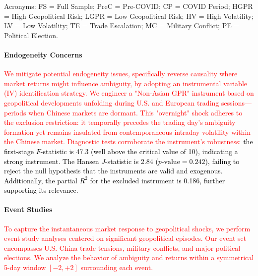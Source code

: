 \documentclass[preprint,12pt,authoryear]{elsarticle}
\begin{document}
\begin{table}[htbp]
\begin{threeparttable}
\begin{tablenotes}[flushleft]
\item[] Acronyms: FS = Full Sample; PreC = Pre-COVID; CP = COVID Period; HGPR = High Geopolitical Risk; LGPR = Low Geopolitical Risk; HV = High Volatility; LV = Low Volatility; TE = Trade Escalation; MC = Military Conflict; PE = Political Election.
\end{tablenotes}
\end{threeparttable}
\end{table}

\paragraph{Endogeneity Concerns} \textcolor{red}{We mitigate potential endogeneity issues, specifically reverse causality where market returns might influence ambiguity, by adopting an instrumental variable (IV) identification strategy. We engineer a "Non-Asian GPR" instrument based on geopolitical developments unfolding during U.S. and European trading sessions—periods when Chinese markets are dormant. This "overnight" shock adheres to the exclusion restriction: it temporally precedes the trading day's ambiguity formation yet remains insulated from contemporaneous intraday volatility within the Chinese market.} \textcolor{black}{ \textcolor{red}{Diagnostic tests corroborate the instrument's robustness:} the first-stage $F$-statistic is 47.3 (well above the critical value of 10), indicating a strong instrument. The Hansen $J$-statistic is 2.84 ($p\text{-value} = 0.242$), failing to reject the null hypothesis that the instruments are valid and exogenous. Additionally, the partial $R^2$ for the excluded instrument is 0.186, further supporting its relevance.}

\paragraph{Event Studies} \textcolor{red}{To capture the instantaneous market response to geopolitical shocks, we perform event study analyses centered on significant geopolitical episodes. Our event set encompasses U.S.-China trade tensions, military conflicts, and major political elections. We analyze the behavior of ambiguity and returns within a symmetrical 5-day window $[-2, +2]$ surrounding each event.}
\end{document}

